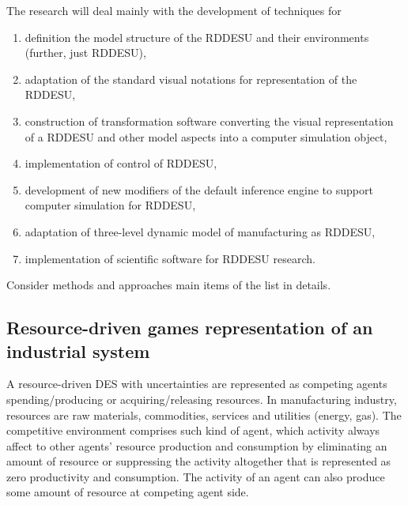 \documentclass[conference]{IEEEtran}
\begin{document}

The research will deal mainly with the development of techniques for
\begin{enumerate}
\item definition the model structure of the RDDESU and their environments (further, just RDDESU),
\item adaptation of the standard visual notations for representation of the RDDESU,
\item construction of transformation software converting the visual representation of a RDDESU and other model aspects into a computer simulation object,
\item implementation of control of RDDESU,
\item development of new modifiers of the default inference engine to support computer simulation for RDDESU,
\item adaptation of three-level dynamic model of manufacturing as RDDESU,
\item implementation of scientific software for RDDESU research.
\end{enumerate}

Consider methods and approaches main items of the list in details.

\subsection{Resource-driven games representation of an industrial system}
\label{sec:sub-rbg}

A resource-driven DES with uncertainties are represented as competing agents spending/producing or acquiring/releasing resources. In manufacturing industry, resources are raw materials, commodities, services and utilities (energy, gas). The competitive environment comprises such kind of agent, which activity always affect to other agents' resource production and consumption by eliminating an amount of resource or suppressing the activity altogether that is represented as zero productivity and consumption. The activity of an agent can also produce some amount of resource at competing agent side.
\end{document}
